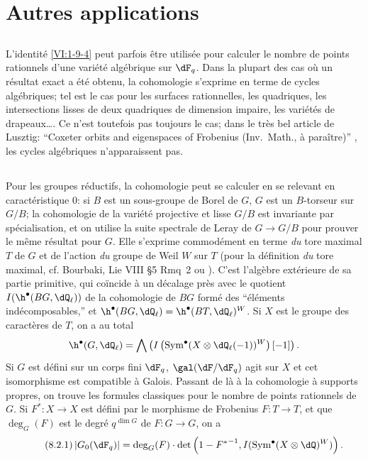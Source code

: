 \section{Autres applications}\label{VI:8}





\subsection{}\label{VI:8-1}

L'identité \ref{VI:1-9-4} peut parfois être utilisée pour calculer 
le nombre de points rationnels d'une variété algébrique sur $\dF_q$. Dans 
la plupart des cas où un résultat exact a été obtenu, la cohomologie 
s'exprime en terme de cycles algébriques; tel est le cas pour les surfaces 
rationnelles, les quadriques, les intersections lisses de deux quadriques de 
dimension impaire, les variétés de drapeaux\ldots. Ce n'est toutefois pas 
toujours le cas; dans le très bel article de Lusztig: ``Coxeter orbits and eigenspaces of Frobenius (Inv.~Math., à paraître)'' \cite{lu76}, les cycles 
algébriques n'apparaissent pas. 





\subsection{}\label{VI:8-2}

Pour les groupes réductifs, la cohomologie peut se calculer en se relevant en 
caractéristique $0$: si $B$ est un sous-groupe de Borel de $G$, $G$ est un 
$B$-torseur sur $G/B$; la cohomologie de la variété projective et lisse 
$G/B$ est invariante par spécialisation, et on utilise la suite spectrale de 
Leray de $G\to G/B$ pour prouver le même résultat pour $G$. Elle s'exprime 
commodément en terme \emph{du} tore maximal $T$ de $G$ et de l'action 
\emph{du} groupe de Weil $W$ sur $T$ (pour la définition \emph{du} tore 
maximal, cf. Bourbaki, Lie VIII \S 5 Rmq~2 \cite[VIII \S 5 Rem.2]{bo05} ou \cite[p.105]{dl76}). C'est 
l'algèbre extérieure de sa partie primitive, qui coïncide à un décalage 
près avec le quotient $I(\h^\bullet(B G,\dQ_\ell))$ de la cohomologie de 
$B G$ formé des ``éléments indécomposables,'' et 
$\h^\bullet(B G,\dQ_\ell)=\h^\bullet(B T,\dQ_\ell)^W$. Si $X$ est le groupe des 
caractères de $T$, on a au total 
\[
  \h^\bullet(G,\dQ_\ell) = \bigwedge \left(I\left(\operatorname{Sym}^\bullet(X\otimes \dQ_\ell(-1))^W\right)[-1]\right) \text{.}
\]
Si $G$ est défini sur un corps fini $\dF_q$, $\gal(\dF/\dF_q)$ agit sur $X$ 
et cet isomorphisme est compatible à Galois. Passant de là à la 
cohomologie à supports propres, on trouve les formules classiques pour le 
nombre de points rationnels de $G$. Si $F^\ast:X\to X$ est défini par le 
morphisme de Frobenius $F:T\to T$, et que $\deg_G(F)$ est le degré 
$q^{\dim G}$ de $F:G\to G$, on a 
\begin{equation*}\tag{8.2.1}\label{VI:eq:8-2-1}
  \left|G_0(\dF_q)\right| = \deg_G(F) \cdot \det\left(1-{F^\ast}^{-1},I(\operatorname{Sym}^\bullet(X\otimes \dQ)^W)\right) \text{.}
\end{equation*}


